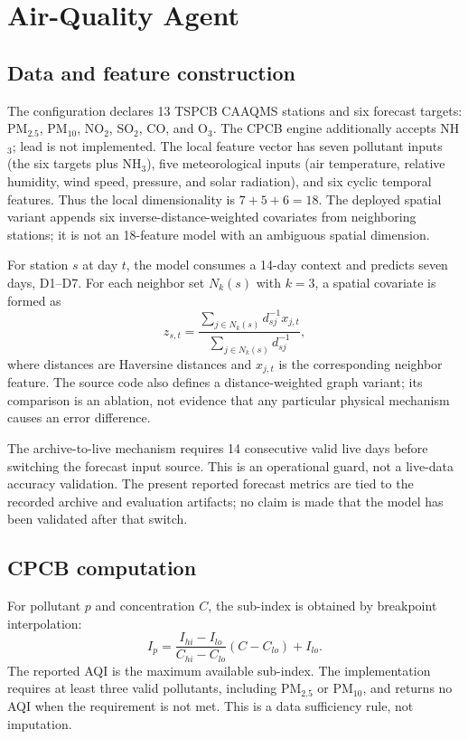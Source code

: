 \documentclass[conference]{IEEEtran}
\begin{document}
\section{Air-Quality Agent}
\label{sec:pollution}
\subsection{Data and feature construction}
The configuration declares 13 TSPCB CAAQMS stations and six forecast targets: PM$_{2.5}$, PM$_{10}$, NO$_2$, SO$_2$, CO, and O$_3$. The CPCB engine additionally accepts NH$_3$; lead is not implemented. The local feature vector has seven pollutant inputs (the six targets plus NH$_3$), five meteorological inputs (air temperature, relative humidity, wind speed, pressure, and solar radiation), and six cyclic temporal features. Thus the local dimensionality is $7+5+6=18$. The deployed spatial variant appends six inverse-distance-weighted covariates from neighboring stations; it is not an 18-feature model with an ambiguous spatial dimension.

For station $s$ at day $t$, the model consumes a 14-day context and predicts seven days, D1--D7. For each neighbor set $N_k(s)$ with $k=3$, a spatial covariate is formed as
\begin{equation}
 z_{s,t}=\frac{\sum_{j\in N_k(s)}d_{sj}^{-1}x_{j,t}}{\sum_{j\in N_k(s)}d_{sj}^{-1}},
\end{equation}
where distances are Haversine distances and $x_{j,t}$ is the corresponding neighbor feature. The source code also defines a distance-weighted graph variant; its comparison is an ablation, not evidence that any particular physical mechanism causes an error difference.

The archive-to-live mechanism requires 14 consecutive valid live days before switching the forecast input source. This is an operational guard, not a live-data accuracy validation. The present reported forecast metrics are tied to the recorded archive and evaluation artifacts; no claim is made that the model has been validated after that switch.

\subsection{CPCB computation}
For pollutant $p$ and concentration $C$, the sub-index is obtained by breakpoint interpolation:
\begin{equation}
 I_p=\frac{I_{hi}-I_{lo}}{C_{hi}-C_{lo}}(C-C_{lo})+I_{lo}.
\end{equation}
The reported AQI is the maximum available sub-index. The implementation requires at least three valid pollutants, including PM$_{2.5}$ or PM$_{10}$, and returns no AQI when the requirement is not met. This is a data sufficiency rule, not imputation.
\end{document}
